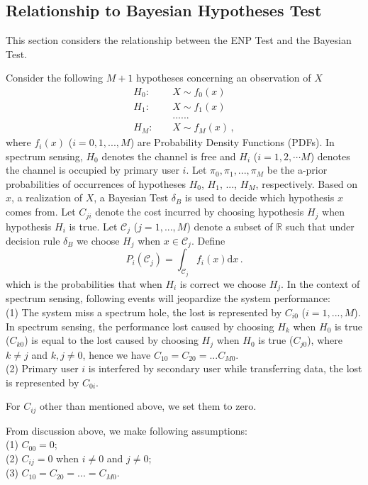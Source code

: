 \subsection{Relationship to Bayesian Hypotheses Test}
This section considers  the relationship between the ENP Test and the Bayesian Test. 

Consider the following $M+1$ hypotheses concerning an observation of $X$
\begin{equation}
\label{equ: 2 pdf}
\begin{split}
H_0:\;\;\;\;&X \sim f_0(x)\\
H_1:\;\;\;\;&X \sim f_1(x)\\
&......\\
H_{M}:\;\;\;\;&X \sim f_M(x)\,,
\end{split}
\end{equation}
where $f_i(x)$ ($i=0, 1, ..., M$) are Probability Density Functions (PDFs). 
In spectrum sensing, $H_0$ denotes the channel is free and $H_i$ ($i = 1, 2, \cdots M$) denotes the channel is occupied by primary user $i$. 
Let $\pi_0, \pi_1, ..., \pi_M$ be the a-prior probabilities of occurrences of hypotheses $H_0$, $H_1$, ..., $H_M$, respectively. 
Based on $x$, a realization of $X$, a Bayesian Test $\delta_B$ is used to decide which hypothesis $x$ comes from.  
Let $C_{ji}$ denote the cost incurred by choosing hypothesis $H_j$ when hypothesis $H_i$ is true. 
Let $\mathcal{C}_j$ ($j=1, ..., M$) denote a subset of $\mathbb{R}$ such that under decision rule $\delta_B$ we choose $H_j$ when $x \in \mathcal{C}_j$. 
Define
\[
P_i(\mathcal{C}_j) = \int_{\mathcal{C}_j} f_i(x)\mathrm{d}x\,.
\]
which is the probabilities that when $H_i$ is correct we choose $H_j$.
In the context of spectrum sensing, following events will jeopardize the system performance:
\\(1) The system miss a spectrum hole, the lost is represented by $C_{i0}$ ($i = 1, ..., M$). In spectrum sensing, the performance lost caused by choosing $H_k$ when $H_0$ is true ($C_{k0}$) is equal to the lost caused by choosing $H_j$ when $H_0$ is true ($C_{j0}$), where $k \neq j$ and $k, j \neq 0$, hence we have $C_{10} = C_{20} = ... C_{M0}$.
\\(2) Primary user $i$ is interfered by secondary user while transferring data, the lost is represented by $C_{0i}$. 

For $C_{ij}$ other than mentioned above, we set them to zero. 

From discussion above,  we make following assumptions:
\\(1) $C_{00} = 0$;
\\(2) $C_{ij} = 0$ when $i \neq 0$ and $j \neq 0$;
\\(3) $C_{10} = C_{20} = ... = C_{M0}$.

